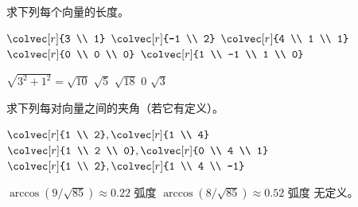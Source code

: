 \begin{exercises}
  \recommended \item
    求下列每个向量的长度。
    \begin{exparts*}
      \partsitem \( \colvec[r]{3 \\ 1}  \)
      \partsitem \( \colvec[r]{-1 \\ 2}  \)
      \partsitem \( \colvec[r]{4 \\ 1 \\ 1}  \)
      \partsitem \( \colvec[r]{0 \\ 0 \\ 0}  \)
      \partsitem \( \colvec[r]{1 \\ -1 \\ 1 \\ 0}  \)
    \end{exparts*}
    \begin{answer}
      \begin{exparts*}
        \partsitem \( \sqrt{3^2+1^2}=\sqrt{10}  \)
        \partsitem \( \sqrt{5}  \)
        \partsitem \( \sqrt{18}  \)
        \partsitem \( 0  \)
        \partsitem \( \sqrt{3}  \)
      \end{exparts*}   
    \end{answer}
  \recommended \item 
    求下列每对向量之间的夹角（若它有定义）。
    \begin{exparts*}
       \partsitem
         \( \colvec[r]{1 \\ 2}, \colvec[r]{1 \\ 4} \)
       \partsitem
         \( \colvec[r]{1 \\ 2 \\ 0}, \colvec[r]{0 \\ 4 \\ 1} \)
       \partsitem
         \( \colvec[r]{1 \\ 2}, \colvec[r]{1 \\ 4 \\ -1} \)
    \end{exparts*}
    \begin{answer}
       \begin{exparts*}
         \partsitem \( \arccos(9/\sqrt{85})\approx 0.22\mbox{\ 弧度} \)
         \partsitem \( \arccos(8/\sqrt{85})\approx 0.52\mbox{\ 弧度} \)
         \partsitem 无定义。
      \end{exparts*}      
     \end{answer}
  \recommended \item 
    \cite{Ohanian}

\end{exercises}
